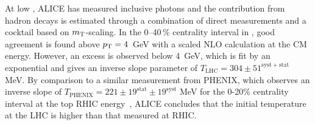 At low \pT, ALICE has measured inclusive photons
and the contribution from hadron decays is estimated through a combination of direct measurements
and a cocktail based on $m_{\rm T}$-scaling.
In the 0--40\,\% centrality interval in \PbPb, good agreement is found above
$\mbox{$p_{\mathrm{T}}$}=4$~GeV with a scaled NLO calculation at the \PbPb CM energy.  However, an excess is observed
below 4~GeV, which is fit by an exponential and gives an inverse slope parameter of
$T_{\mathrm{LHC}} = 304 \pm 51^{\mathrm{syst+stat}}$ MeV.  By comparison to a similar
measurement from PHENIX, which observes an inverse slope of
$T_{\mathrm{PHENIX}}=221 \pm 19^{\mathrm{stat}} \pm 19^{\mathrm{syst}}$ MeV for the 0-20\%
centrality interval at the top RHIC energy~\cite{Adare:2008ab},
ALICE concludes that the initial temperature at the LHC is higher
than that measured at RHIC.


